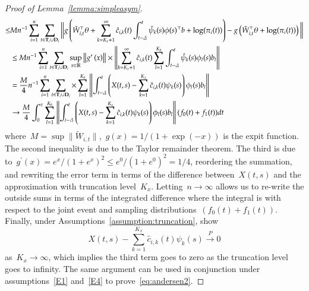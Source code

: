 \documentclass[11pt]{amsart}
\def\bfT{{\bf T}}
\def\bfD{{\bf D}}
\begin{document}
\begin{proof}[Proof of Lemma~\ref{lemma:simpleasym}]
\begin{align*}
  \leq & M n^{-1} \sum_{i=1}^n \sum_{t \in \bfT_i \cup \bfD_i} \bigg \| g
         \left( \tilde W_{i,t}^\top \theta  + \sum_{k=K_x+1}^\infty \hat
         c_{i,k} (t) \int_{t-\Delta}^t \hat \psi_k (s) \phi (s)^\top b
         + \log (\pi_i (t) ) \right) - g \left( \tilde W_{i,t}^\top
         \theta + \log (\pi_i (t)) \right) \bigg \| \\
&\leq M n^{-1} \sum_{i=1}^n \sum_{t \in \bfT_i \cup \bfD_i}
    \sup_{x \in \mathbb{R}} \left \| g^\prime \left( x \right)
  \right\| \times \left \| \sum_{k=K_x+1}^\infty \hat c_{i,k} (t)
  \sum_{l=1}^{K_b} \int_{t-\Delta}^t \hat \psi_k (s) \phi_l (s) b_l
  \right \| \\
&= \frac{M}{4} n^{-1} \sum_{i=1}^n \sum_{t \in \bfT_i \cup \bfD_i}
  \times \sum_{l=1}^{K_b} \left \| \int_{t-\Delta}^t
  \left( X(t,s) - \sum_{k=1}^{K_x} \hat c_{i,k} (t) \psi_k (s) \right)
  \phi_l (s) b_l\right \| \\
&\to \frac{M}{4} \int_0^\tau \sum_{l=1}^{K_b} \left \| \int_{t-\Delta}^t
  \left( X(t,s) - \sum_{k=1}^{K_x} \hat c_{i,k} (t) \psi_k (s) \right)
  \phi_l (s) b_l\right \| (f_0(t) + f_1(t)) dt
\end{align*}
where~$M = \sup \| \tilde W_{i,t} \|$,~$g(x) = 1/(1+\exp(-x))$ is the
expit function.
The second inequality is due to the Taylor remainder theorem. The third is due to~$g^\prime (x) = e^x/(1+e^x)^2 \leq e^0/(1+e^0)^2 = 1/4$, reordering the summation, and rewriting the error term in terms of the difference between~$X(t,s)$ and the approximation with truncation level~$K_x$. Letting~$n \to \infty$ allows us to re-write the outside sums in terms of the integrated difference where the integral is with respect to the joint event and sampling distributions~$(f_0(t) + f_1 (t))$. Finally, under Assumptions~\ref{assumption:truncation}, \cite{Park2018} show
\[
X(t,s) - \sum_{k=1}^{K_x} \hat c_{i,k} (t) \psi_k (s) \overset{P}{\to} 0
\]
as~$K_x \to \infty$, which implies the third term goes to zero as the truncation level goes to infinity. The same argument can be used in conjunction under assumptions~\ref{E1} and~\ref{E4} to prove~\eqref{eq:andersen2}.


\end{proof}
\end{document}
